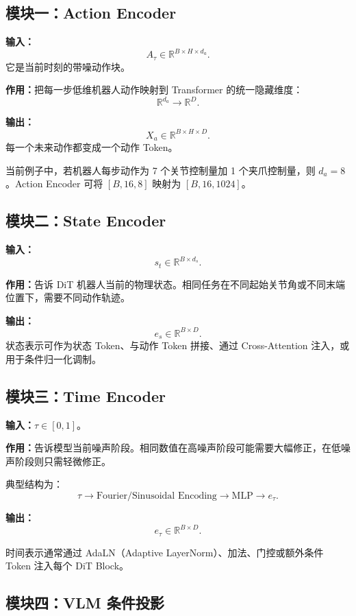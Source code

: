 \documentclass[UTF8,11pt,a4paper]{ctexart}
\begin{document}
\subsection{模块一：Action Encoder}

\textbf{输入：}
\[
A_\tau\in\mathbb{R}^{B\times H\times d_a}.
\]
它是当前时刻的带噪动作块。

\textbf{作用：}把每一步低维机器人动作映射到 Transformer 的统一隐藏维度：
\[
\mathbb{R}^{d_a}\rightarrow\mathbb{R}^{D}.
\]

\textbf{输出：}
\[
X_a\in\mathbb{R}^{B\times H\times D}.
\]
每一个未来动作都变成一个动作 Token。

\begin{examplebox}
当前例子中，若机器人每步动作为 7 个关节控制量加 1 个夹爪控制量，则 $d_a=8$。Action Encoder 可将 $[B,16,8]$ 映射为 $[B,16,1024]$。
\end{examplebox}

\subsection{模块二：State Encoder}

\textbf{输入：}
\[
s_t\in\mathbb{R}^{B\times d_s}.
\]

\textbf{作用：}告诉 DiT 机器人当前的物理状态。相同任务在不同起始关节角或不同末端位置下，需要不同动作轨迹。

\textbf{输出：}
\[
e_s\in\mathbb{R}^{B\times D}.
\]
状态表示可作为状态 Token、与动作 Token 拼接、通过 Cross-Attention 注入，或用于条件归一化调制。

\subsection{模块三：Time Encoder}

\textbf{输入：}$\tau\in[0,1]$。

\textbf{作用：}告诉模型当前噪声阶段。相同数值在高噪声阶段可能需要大幅修正，在低噪声阶段则只需轻微修正。

典型结构为：
\[
\tau\rightarrow\text{Fourier/Sinusoidal Encoding}\rightarrow\text{MLP}\rightarrow e_\tau.
\]

\textbf{输出：}
\[
e_\tau\in\mathbb{R}^{B\times D}.
\]

时间表示通常通过 AdaLN（Adaptive LayerNorm）、加法、门控或额外条件 Token 注入每个 DiT Block。

\subsection{模块四：VLM 条件投影}
\end{document}
